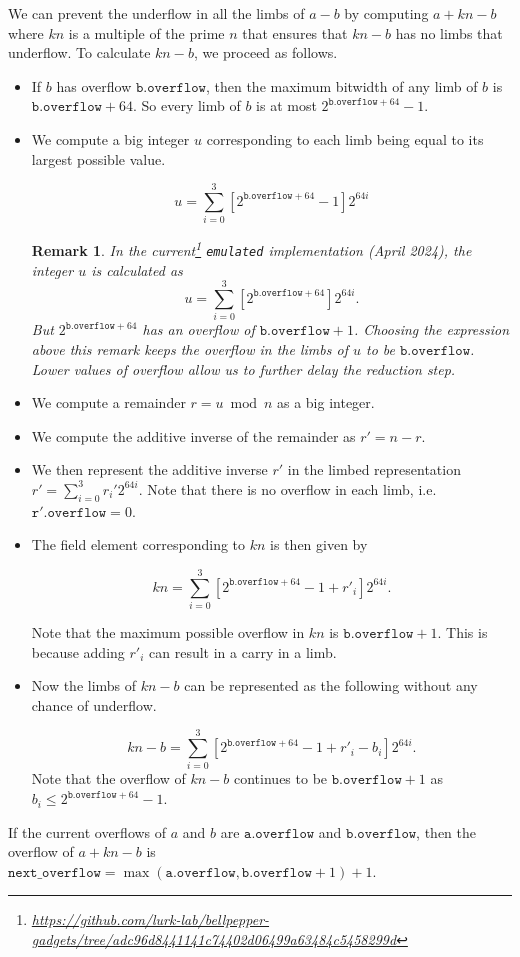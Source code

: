 \documentclass[a4paper, 12pt]{article}
\newtheorem*{remark}{Remark}
\begin{document}
We can prevent the underflow in all the limbs of $a-b$ by computing $a+kn-b$ where $kn$ is a multiple of the prime $n$ that ensures that $kn-b$ has no limbs that underflow.  To calculate $kn-b$, we proceed as follows.
\begin{itemize}
  \item If $b$ has overflow $\texttt{b.overflow}$, then the maximum bitwidth of any limb of $b$ is $\texttt{b.overflow}+64$. So every limb of $b$ is at most $2^{\texttt{b.overflow}+64}-1$.
  \item  We compute a big integer $u$ corresponding to each limb being equal to its largest possible value.

    $$u = \sum_{i=0}^{3} \left[2^{\texttt{b.overflow}+ 64} - 1 \right] 2^{64i}$$

    \begin{remark}
    In the current\footnote{\url{https://github.com/lurk-lab/bellpepper-gadgets/tree/adc96d8441141c74402d06499a63484c5458299d}} \texttt{emulated} implementation (April 2024), the integer $u$ is calculated as $$u = \sum_{i=0}^{3} \left[2^{\texttt{b.overflow}+ 64} \right] 2^{64i}.$$ But $2^{\texttt{b.overflow}+ 64}$ has an overflow of $\texttt{b.overflow}+1$. Choosing the expression above this remark keeps the overflow in the limbs of $u$ to be $\texttt{b.overflow}$. Lower values of overflow allow us to further delay the reduction step.
    \end{remark}

  \item  We compute a remainder $r = u \bmod n$ as a big integer.
  \item  We compute the additive inverse of the remainder as $r' = n - r$.
  \item  We then represent the additive inverse $r'$ in the limbed representation $r' = \sum_{i=0}^3 r_i' 2^{64i}$. Note that there is no overflow in each limb, i.e.~$\texttt{r}'.\texttt{overflow} = 0$.
  \item  The field element corresponding to $kn$ is then given by

    $$kn = \sum_{i=0}^{3} \left[2^{\texttt{b.overflow}+ 64} - 1 + r'_i\right] 2^{64i}.$$
    
    Note that the maximum possible overflow in $kn$ is $\texttt{b.overflow}+1$.  This is because adding $r'_i$ can result in a carry in a limb.

  \item  Now the limbs of $kn-b$ can be represented as the following without any chance of underflow.

    $$kn-b = \sum_{i=0}^{3} \left[2^{\texttt{b.overflow}+ 64} -1 + r'_i- b_i\right] 2^{64i}.$$
    Note that the overflow of $kn-b$ continues to be  $\texttt{b.overflow}+1$ as $b_i \le 2^{\texttt{b.overflow}+ 64}-1$.

\end{itemize}
If the current overflows of $a$ and $b$ are $\texttt{a.overflow}$ and $\texttt{b.overflow}$, then the overflow of $a+kn-b$ is $\texttt{next\_overflow} = \max(\texttt{a.overflow}, \texttt{b.overflow}+1) + 1$.
\end{document}
